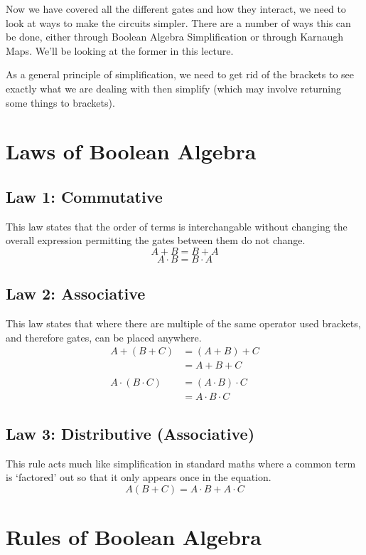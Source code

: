 
Now we have covered all the different gates and how they interact, we need to look at ways to make the circuits simpler. There are a number of ways this can be done, either through Boolean Algebra Simplification or through Karnaugh Maps. We'll be looking at the former in this lecture.

As a general principle of simplification, we need to get rid of the brackets to see exactly what we are dealing with then simplify (which may involve returning some things to brackets).

\section*{Laws of Boolean Algebra}
\subsection*{Law 1: Commutative}
This law states that the order of terms is interchangable without changing the overall expression permitting the gates between them do not change.
\[A + B = B + A\]
\[A \cdot B = B \cdot A\]

\subsection*{Law 2: Associative}
This law states that where there are multiple of the same operator used brackets, and therefore gates, can be placed anywhere.
\begin{align*}
A + (B  + C) &= (A + B) + C\\
&= A + B + C\\ \\
A \cdot (B \cdot C) &= (A \cdot B) \cdot C\\
&= A \cdot B \cdot C
\end{align*}

\subsection*{Law 3: Distributive (Associative)}
This rule acts much like simplification in standard maths where a common term is `factored' out so that it only appears once in the equation.
\[ A(B+C) = A\cdot B + A \cdot C \]

\section*{Rules of Boolean Algebra}
